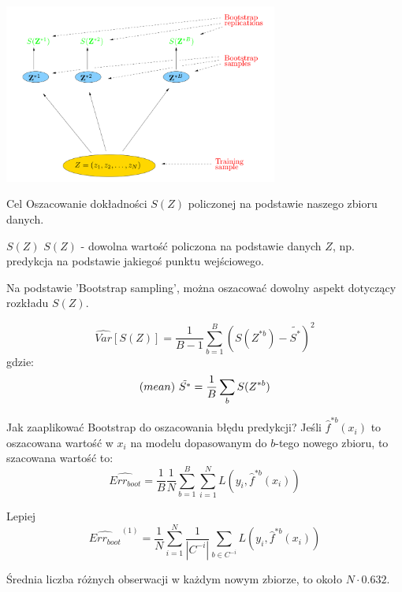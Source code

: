 \documentclass[a4paper]{beamer}
\begin{document}
\begin{frame}

\begin{center}
\includegraphics[width=9cm]{fig7-12.png}
\end{center}
\begin{block}{Cel}
Oszacowanie dokładności $S(Z)$ policzonej na podstawie naszego zbioru danych.
\end{block}
\end{frame}

\begin{frame}
\begin{block}{$S(Z)$}
$S(Z)$ - dowolna wartość policzona na podstawie danych $Z$, np. predykcja na podstawie jakiegoś punktu wejściowego.
\end{block}

\begin{block}{}
Na podstawie 'Bootstrap sampling', można oszacować dowolny aspekt dotyczący   rozkładu $S(Z)$.

$$\widehat{Var}[S(Z)] = \frac{1}{B-1} \sum^{B}_{b=1} (S(Z^{* b}) - \tilde{S^{*}})^2$$
gdzie:
$${\text (mean) \ } \tilde{S^{*}} = \frac{1}{B} \sum_b S(Z^{* b})$$
\end{block}
\end{frame}

\begin{frame}
\begin{block}{Jak zaaplikować Bootstrap do oszacowania błędu predykcji?}
Jeśli $\hat{f}^{* b}(x_i)$ to oszacowana wartość w $x_i$ na modelu dopasowanym do $b$-tego nowego zbioru, to szacowana wartość to:
$$\widehat{Err_{boot}} = \frac{1}{B} \frac{1}{N} \sum_{b=1}^{B} \sum_{i=1}^{N} L(y_i, \hat{f}^{* b}(x_i))$$
\end{block}
\pause
\begin{block}{Lepiej}
$$\widehat{Err_{boot}}^{(1)} = \frac{1}{N} \sum^{N}_{i=1} \frac{1}{|C^{-i}|} \sum_{b \in C^{-i}} L (y_i, \hat{f}^{* b}(x_i))$$
\end{block}
\pause
\begin{block}{}
Średnia liczba różnych obserwacji w każdym nowym zbiorze, to około $N \cdot 0.632$.
\end{block}
\end{frame}
\end{document}
